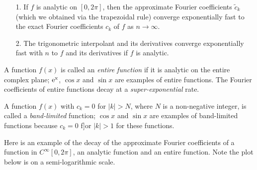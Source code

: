 \documentclass[12pt,a4paper]{article}
\begin{document}
\begin{itemize}
\item[1. ] If $f$ is analytic on $[0, 2\pi]$, then the approximate Fourier coefficients $\widetilde{c}_k$ (which we obtained via the trapezoidal rule) converge exponentially fast to the exact Fourier coefficients $c_k$ of $f$ as $n \to \infty$.   


\item[2. ] The trigonometric interpolant and its derivatives converge exponentially fast with $n$ to $f$ and its derivatives if $f$ is analytic.

\end{itemize}
A function $f(x)$ is called an \emph{entire function} if it is analytic on the entire complex plane; ${\rm e^{x}}$, $\cos x$ and $\sin x$ are examples of entire functions. The Fourier coefficients of entire functions decay at a \emph{super-exponential} rate.

A function $f(x)$ with $c_{k} = 0$ for $\vert k \vert > N$, where $N$ is a non-negative integer, is called a \emph{band-limited} function; $\cos x$ and $\sin x$ are examples of band-limited functions because $c_{k} = 0$ f]or $\vert k \vert > 1$ for these functions.

Here is an example of the decay of the approximate Fourier coefficients of a function in $C^{\infty}[0, 2\pi]$, an analytic function and an entire function. Note the plot below is on a semi-logarithmic scale.
\end{document}

